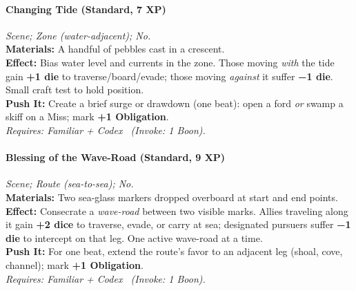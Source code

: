 \paragraph{Changing Tide (Standard, 7 XP)} \emph{Scene; Zone (water-adjacent); No.}\\
\textbf{Materials:} A handful of pebbles cast in a crescent.\\
\textbf{Effect:} Bias water level and currents in the zone. Those moving \emph{with} the tide gain \textbf{+1 die} to traverse/board/evade; those moving \emph{against} it suffer \textbf{−1 die}. Small craft test to hold position.\\
\textbf{Push It:} Create a brief surge or drawdown (one beat): open a ford \emph{or} swamp a skiff on a Miss; mark \textbf{+1 Obligation}.\\
\emph{Requires: Familiar + Codex \ (\textit{Invoke:} 1 Boon).}

\paragraph{Blessing of the Wave-Road (Standard, 9 XP)} \emph{Scene; Route (sea-to-sea); No.}\\
\textbf{Materials:} Two sea-glass markers dropped overboard at start and end points.\\
\textbf{Effect:} Consecrate a \emph{wave-road} between two visible marks. Allies traveling along it gain \textbf{+2 dice} to traverse, evade, or carry at sea; designated pursuers suffer \textbf{−1 die} to intercept on that leg. One active wave-road at a time.\\
\textbf{Push It:} For one beat, extend the route’s favor to an adjacent leg (shoal, cove, channel); mark \textbf{+1 Obligation}.\\
\emph{Requires: Familiar + Codex \ (\textit{Invoke:} 1 Boon).}

